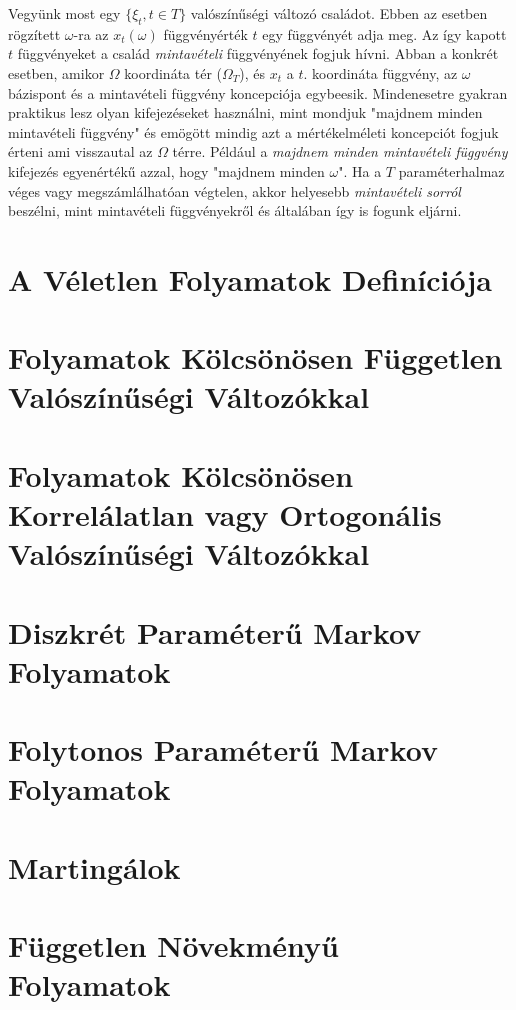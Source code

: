 \documentclass{article}
\begin{document}
Vegyünk most egy $\{\xi_t, t \in T\}$ valószínűségi változó családot. Ebben az esetben rögzített $\omega$-ra az $x_t(\omega)$ függvényérték $t$ egy függvényét adja meg. Az így kapott $t$ függvényeket a család \textit{mintavételi} függvényének fogjuk hívni. Abban a konkrét esetben, amikor $\Omega$ koordináta tér ($\Omega_T$), és $x_t$ a $t$. koordináta függvény, az $\omega$ bázispont és a mintavételi függvény koncepciója egybeesik. Mindenesetre gyakran praktikus lesz olyan kifejezéseket használni, mint mondjuk "majdnem minden mintavételi függvény" és emögött mindig azt a mértékelméleti koncepciót fogjuk érteni ami visszautal az $\Omega$ térre. Például a \textit{majdnem minden mintavételi függvény} kifejezés egyenértékű azzal, hogy "majdnem minden $\omega$". Ha a $T$ paraméterhalmaz véges vagy megszámlálhatóan végtelen, akkor helyesebb \textit{mintavételi sorról} beszélni, mint mintavételi függvényekről és általában így is fogunk eljárni.

\section{A Véletlen Folyamatok Definíciója}\label{sec:veletlenfolyamatokdefinicioja}
\section{Folyamatok Kölcsönösen Független Valószínűségi Változókkal}\label{sec:folyamatokkolcsonosenfuggetlenvaloszinusegivaltozokkal}
\section{Folyamatok Kölcsönösen Korrelálatlan vagy Ortogonális Valószínűségi Változókkal}\label{sec:folyamatokkolcsonosenkorrelalatlanvagyortogonalisvaloszinusegivaltozokkal}
\section{Diszkrét Paraméterű Markov Folyamatok}\label{sec:diszkretparameterumarkov}
\section{Folytonos Paraméterű Markov Folyamatok}\label{sec:folytonosparameterumarkov}
\section{Martingálok}\label{sec:martingalok}
\section{Független Növekményű Folyamatok}\label{sec:fuggetlennovekmenyufolyamatok}
\end{document}
